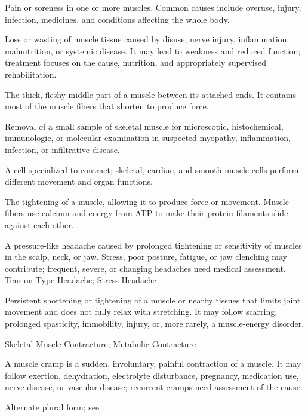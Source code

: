  Pain or soreness in one or more muscles. Common causes include overuse, injury, infection, medicines, and conditions affecting the whole body.

 Loss or wasting of muscle tissue caused by disuse, nerve injury, inflammation, malnutrition, or systemic disease.
It may lead to weakness and reduced function; treatment focuses on the cause, nutrition, and
appropriately supervised rehabilitation.

 The thick, fleshy middle part of a muscle between its attached ends. It contains most of the muscle fibers that shorten to produce force.

 Removal of a small sample of skeletal muscle for microscopic, histochemical, immunologic, or molecular examination in suspected myopathy, inflammation, infection, or infiltrative disease.

 A cell specialized to contract; skeletal, cardiac, and smooth muscle cells perform different movement and organ functions.

 The tightening of a muscle, allowing it to produce force or movement. Muscle fibers use calcium and energy from ATP to make their protein filaments slide against each other.

 A pressure-like headache caused by prolonged tightening or sensitivity of muscles in the scalp, neck, or jaw. Stress, poor posture, fatigue, or jaw clenching may contribute; frequent, severe, or changing headaches need medical assessment.
\synonyms
Tension-Type Headache; Stress Headache

 Persistent shortening or tightening of a muscle or nearby tissues that limits joint movement and does not fully relax with stretching. It may follow scarring, prolonged spasticity, immobility, injury, or, more rarely, a muscle-energy disorder.

\synonyms
Skeletal Muscle Contracture; Metabolic Contracture

 A muscle cramp is a sudden, involuntary, painful contraction of a muscle. It may follow exertion, dehydration, electrolyte disturbance, pregnancy, medication use, nerve disease, or vascular disease; recurrent cramps need assessment of the cause.

 Alternate plural form; see .

